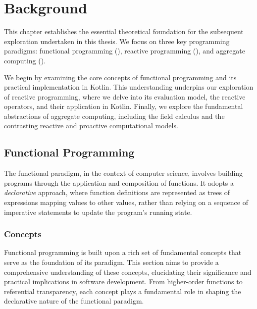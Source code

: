 
\chapter{Background}
\label{chap:background}

This chapter establishes the essential theoretical foundation for the subsequent exploration undertaken in this thesis. We focus on three key programming paradigms: functional programming (), reactive programming (), and aggregate computing ().

We begin by examining the core concepts of functional programming and its practical implementation in Kotlin. This understanding underpins our exploration of reactive programming, where we delve into its evaluation model, the reactive operators, and their application in Kotlin. Finally, we explore the fundamental abstractions of aggregate computing, including the field calculus and the contrasting reactive and proactive computational models.

\section{Functional Programming}
\label{section:functional-programming}

The functional paradigm, in the context of computer science, involves building programs through the application and composition of functions. It adopts a \textit{declarative} approach, where function definitions are represented as trees of expressions mapping values to other values, rather than relying on a sequence of imperative statements to update the program's running state.

\subsection{Concepts}

Functional programming is built upon a rich set of fundamental concepts that serve as the foundation of its paradigm. This section aims to provide a comprehensive understanding of these concepts, elucidating their significance and practical implications in software development. From higher-order functions to referential transparency, each concept plays a fundamental role in shaping the declarative nature of the functional paradigm.

